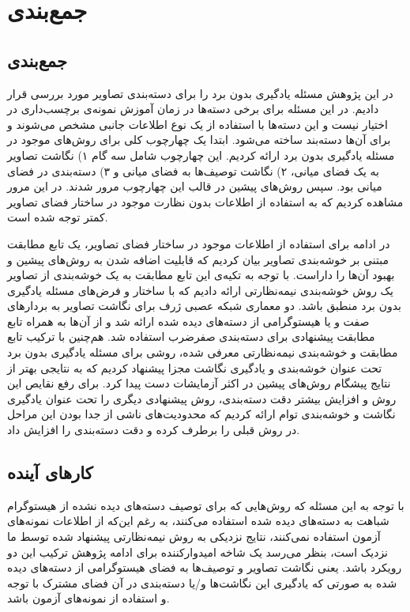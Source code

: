 \chapter{جمع‌بندی} \label{chap:conclusion}
\section{جمع‌بندی}
در این پژوهش مسئله یادگیری بدون برد را برای دسته‌بندی تصاویر مورد بررسی قرار دادیم. در این مسئله برای برخی دسته‌ها در زمان آموزش نمونه‌ی برچسب‌داری در اختیار نیست و این دسته‌ها با استفاده از یک نوع اطلاعات جانبی مشخص می‌شوند و برای آن‌ها دسته‌بند ساخته می‌شود. ابتدا یک چهارچوب کلی برای روش‌های موجود در مسئله یادگیری بدون برد ارائه کردیم. این چهارچوب شامل سه گام ۱) نگاشت تصاویر به یک فضای میانی، ۲) نگاشت توصیف‌ها به فضای میانی و ۳) دسته‌بندی در فضای میانی بود. سپس روش‌های پیشین در قالب این چهارچوب مرور شدند. در این مرور مشاهده کردیم که به استفاده از اطلاعات بدون نظارت موجود در ساختار فضای تصاویر کمتر توجه شده است. 

در ادامه برای استفاده از اطلاعات موجود در ساختار فضای تصاویر، یک تابع مطابقت مبتنی بر خوشه‌بندی تصاویر بیان کردیم که قابلیت اضافه شدن به روش‌های پیشین و بهبود آن‌ها را داراست. با توجه به تکیه‌ی این تابع مطابقت به یک خوشه‌بندی از تصاویر یک روش خوشه‌بندی نیمه‌نظارتی ارائه دادیم که با ساختار و فرض‌های مسئله یادگیری بدون برد منطبق باشد. دو معماری شبکه عصبی ژرف برای نگاشت تصاویر به بردارهای صفت و یا هیستوگرامی از دسته‌های دیده شده ارائه شد و از آن‌ها به همراه تابع مطابقت پیشنهادی برای دسته‌بندی صفرضرب استفاده شد. هم‌چنین با ترکیب تابع مطابقت و خوشه‌بندی نیمه‌نظارتی معرفی شده،  روشی برای مسئله یادگیری بدون برد تحت عنوان خوشه‌بندی و یادگیری نگاشت مجزا پیشنهاد کردیم که به نتایجی بهتر از نتایج پیشگام روش‌های پیشین در اکثر آزمایشات دست پیدا کرد. برای رفع نقایص این روش و  افزایش بیشتر دقت دسته‌بندی، روش پیشنهادی دیگری را تحت عنوان یادگیری نگاشت و خوشه‌بندی توام ارائه کردیم که محدودیت‌های ناشی از جدا بودن این مراحل در روش قبلی را برطرف کرده و دقت دسته‌بندی را افزایش داد. 
\section{کار‌های آینده}
با توجه به این مسئله که روش‌هایی که برای توصیف دسته‌های دیده نشده از هیستوگرام شباهت به دسته‌های دیده شده استفاده می‌کنند، به رغم این‌که از اطلاعات نمونه‌های آزمون استفاده نمی‌کنند، نتایج نزدیکی به روش نیمه‌نظارتی پیشنهاد شده توسط ما نزدیک است، بنظر می‌رسد یک شاخه امیدوارکننده برای ادامه پژوهش ترکیب این دو رویکرد باشد. یعنی نگاشت تصاویر و توصیف‌ها به فضای هیستوگرامی از دسته‌های دیده شده به صورتی که یادگیری این نگاشت‌ها و/یا دسته‌بندی در آن فضای مشترک با توجه و استفاده از نمونه‌های آزمون باشد.


